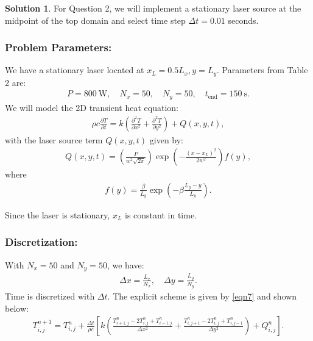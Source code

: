 \documentclass[12pt]{article}
\theoremstyle{definition} %
\newtheorem{solution}{Solution}
\theoremstyle{plain} %
\begin{document}
\begin{solution}
    

        For Question 2, we will implement a stationary laser source at the midpoint of the top domain and select time step $\Delta t = 0.01$ seconds.


            \subsubsection*{Problem Parameters:}  
            We have a stationary laser located at $ x_L = 0.5L_x, y = L_y $. Parameters from Table 2 are:
            \begin{align}
            P = 800\ \text{W}, \quad N_x = 50, \quad N_y = 50, \quad t_\text{end} = 150\ \text{s}.
            \end{align}
            We will model the 2D transient heat equation:
            \begin{align}
            \rho c \frac{\partial T}{\partial t} = k\left( \frac{\partial^2 T}{\partial x^2} + \frac{\partial^2 T}{\partial y^2} \right) + Q(x,y,t),
            \end{align}
            with the laser source term $ Q(x,y,t) $ given by:
            \begin{align}
            Q(x,y,t) = \left(\frac{P}{w^2 \sqrt{2\pi}}\right)\exp\left(-\frac{(x - x_L)^2}{2w^2}\right)f(y),
            \end{align}
            where
            \begin{align}
            f(y) = \frac{\beta}{L_y}\exp\left(-\beta\frac{L_y - y}{L_y}\right).
            \end{align}
        
            Since the laser is stationary, $ x_L $ is constant in time.
        
            \subsubsection*{Discretization:}  
            With $ N_x = 50 $ and $ N_y = 50 $, we have:
            \begin{align}
            \Delta x = \frac{L_x}{N_x}, \quad \Delta y = \frac{L_y}{N_y}.
            \end{align}
            Time is discretized with $\Delta t$. The explicit scheme is given by \autoref{eqn7} and shown below:
            \begin{align}
            T_{i,j}^{n+1} = T_{i,j}^n + \frac{\Delta t}{\rho c}\left[ k\left(\frac{T_{i+1,j}^n - 2T_{i,j}^n + T_{i-1,j}^n}{\Delta x^2} + \frac{T_{i,j+1}^n - 2T_{i,j}^n + T_{i,j-1}^n}{\Delta y^2}\right) + Q_{i,j}^n \right].
            \end{align}
        

\end{solution}
\end{document}
